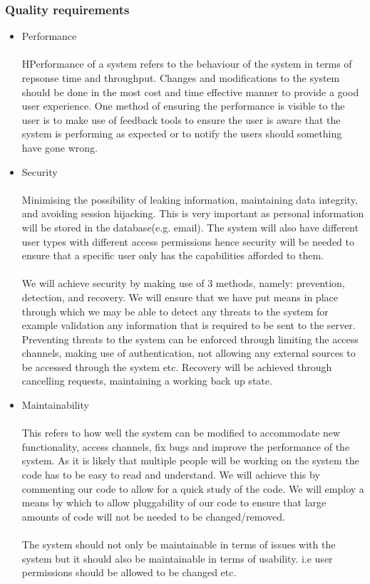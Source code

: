 \documentclass[a4paper]{article}
\begin{document}
	\subsubsection{Quality requirements}
	\begin{itemize}
		 \begin{itemize}
		\item Performance \\\\
		    HPerformance of a system refers to the behaviour of the system in terms of repsonse time and throughput. Changes and modifications to the system should be done in the most cost and time effective manner to provide a good user experience.
		    One method of ensuring the performance is visible to the user is to make use of feedback tools to ensure the user is aware that the system is performing as expected or to notify the users should something have gone wrong.  
		\item Security \\\\
		    Minimising the possibility of leaking information, maintaining data integrity, and avoiding session hijacking. This is very important as personal information will be stored in the database(e.g. email). The system will also have different user types with different access permissions hence security will be needed to ensure that a specific user only has the capabilities afforded to them. 
		    \\\\
		    We will achieve security by making use of 3 methods, namely: prevention, detection, and recovery.
		    We will ensure that we have put means in place through which we may be able to detect any threats to the system for example validation any information that is required to be sent to the server. Preventing threats to the system can be enforced through limiting the access channels, making use of authentication, not allowing any external sources to be accessed through the system etc. Recovery will be achieved through cancelling requests, maintaining a working back up state.
		\item Maintainability \\\\
		    This refers to how well the system can be modified to accommodate new functionality, access channels, fix bugs and improve the performance of the system. As it is likely that multiple people will be working on the system the code has to be easy to read and understand. We will achieve this by commenting our code to allow for a quick study of the code. We will employ a means by which to allow pluggability of our code to ensure that large amounts of code will not be needed to be changed/removed.
		    \\\\
		    The system should not only be maintainable in terms of issues with the system but it should also be maintainable in terms of usability. i.e user permissions should be allowed to be changed etc.
		    

\end{itemize}
\end{itemize}
\end{document}
